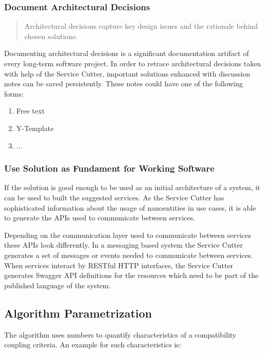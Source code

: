 \subsubsection{Document Architectural Decisions}

\begin{quote}
	Architectural decisions capture key design issues and the rationale behind chosen solutions.\cite{zioAD}
\end{quote}

Documenting architectural decisions is a significant documentation artifact of every long-term software project. In order to retrace architectural decisions taken with help of the Service Cutter, important solutions enhanced with discussion notes can be saved persistently. These notes could have one of the following forms:

\begin{enumerate}
	\item Free text
	\item Y-Template\cite{y-template}
	\item ...
\end{enumerate}

\subsubsection{Use Solution as Fundament for Working Software}

If the solution is good enough to be used as an initial architecture of a system, it can be used to built the suggested services. As the Service Cutter has sophisticated information about the usage of nanoentities in use cases, it is able to generate the APIs used to communicate between services. 

Depending on the communication layer used to communicate between services these APIs look differently. In a messaging based system the Service Cutter generates a set of messages or events needed to communicate between services. When services interact by RESTful HTTP interfaces, the Service Cutter generates Swagger\cite{swagger} API definitions for the resources which need to be part of the published language\cite[p.375]{evans2003domain} of the system. 


\subsection{Algorithm Parametrization}

The algorithm uses numbers to quantify characteristics of a compatibility coupling criteria. An example for such characteristics is:

